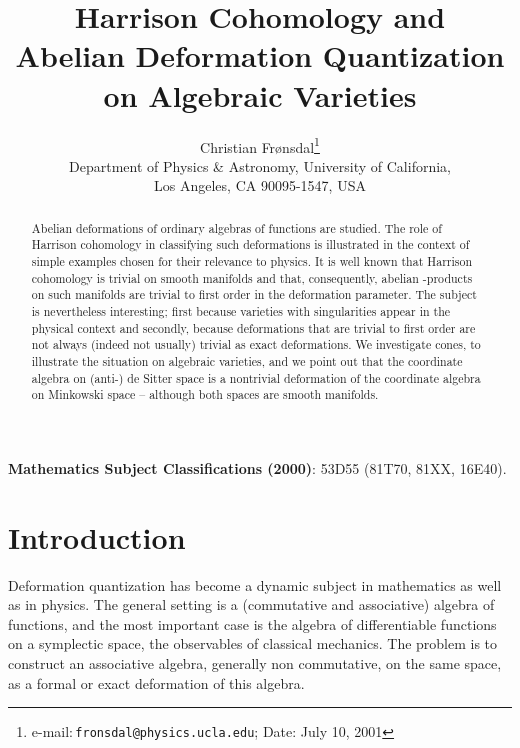 \documentclass[a4paper,a4paper]{article}
\begin{document}
\title{Harrison Cohomology and \\Abelian Deformation Quantization\\
on Algebraic Varieties}

\author{Christian Fr\o nsdal\thanks{e-mail:\,\texttt{fronsdal@physics.ucla.edu};
\quad Date: July 10, 2001} \\
{Department of Physics \& Astronomy, University of California,}\\
{Los Angeles, CA 90095-1547, USA }}
\date{}
\maketitle

\begin{abstract}
 Abelian deformations of ordinary algebras of
functions are studied. The role of Harrison cohomology in classifying such
deformations is illustrated in the context of simple examples chosen for
their relevance to physics.  It is well known that Harrison cohomology is
trivial on smooth manifolds and that, consequently,  abelian
\myHighlight{$*$}\coordHE{}-products on such manifolds are trivial to first order in the
deformation parameter. The subject is nevertheless interesting;  first
because varieties with singularities appear in the physical context and
secondly, because deformations that are trivial to first order are not
always (indeed not usually) trivial as exact deformations. We investigate
cones, to illustrate the situation on algebraic varieties, and we point
out that the coordinate algebra on  (anti-) de Sitter space is a nontrivial
deformation of the coordinate algebra on Minkowski space  -- although
both spaces are smooth manifolds. 
\end{abstract}

\noindent\textbf{Mathematics Subject Classifications (2000)}: 
53D55 (81T70, 81XX, 16E40).


\section{Introduction}  %
Deformation quantization has become a dynamic subject in mathematics
as well as in physics. The general setting is a (commutative and
associative) algebra of functions, and the most important case is the
algebra of differentiable functions on a symplectic space, the observables
of classical mechanics. The problem is to construct an associative algebra,
generally non commutative, on the same space, as a formal or exact
deformation of this algebra. 
\end{document}
